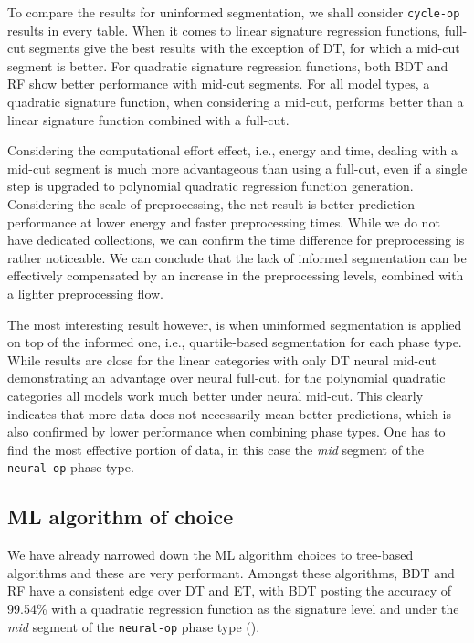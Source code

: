 To compare the results for uninformed segmentation, we shall consider \texttt{cycle-op} results in every table. When it comes to linear signature regression functions, full-cut segments give the best results with the exception of DT, for which a mid-cut segment is better. For quadratic signature regression functions, both BDT and RF show better performance with mid-cut segments. For all model types, a quadratic signature function, when considering a mid-cut, performs better than a linear signature function combined with a full-cut.

Considering the computational effort effect, i.e., energy and time, dealing with a mid-cut segment is much more advantageous than using a full-cut, even if a single step is upgraded to polynomial quadratic regression function generation. Considering the scale of preprocessing, the net result is better prediction performance at lower energy and faster preprocessing times. While we do not have dedicated collections, we can confirm the time difference for preprocessing is rather noticeable. We can conclude that the lack of informed segmentation can be effectively compensated by an increase in the preprocessing levels, combined with a lighter preprocessing flow.

The most interesting result however, is when uninformed segmentation is applied on top of the informed one, i.e., quartile-based segmentation for each phase type. While results are close for the linear categories with only DT neural mid-cut demonstrating an advantage over neural full-cut, for the polynomial quadratic categories all models work much better under neural mid-cut. This clearly indicates that more data does not necessarily mean better predictions, which is also confirmed by lower performance when combining phase types. One has to find the most effective portion of data, in this case the \emph{mid} segment of the \texttt{neural-op} phase type.

\subsection{ML algorithm of choice}
We have already narrowed down the ML algorithm choices to tree-based algorithms and these are very performant. Amongst these algorithms, BDT and RF have a consistent edge over DT and ET, with BDT posting the accuracy of 99.54\% with a quadratic regression function as the signature level and under the \emph{mid} segment of the \texttt{neural-op} phase type ().

